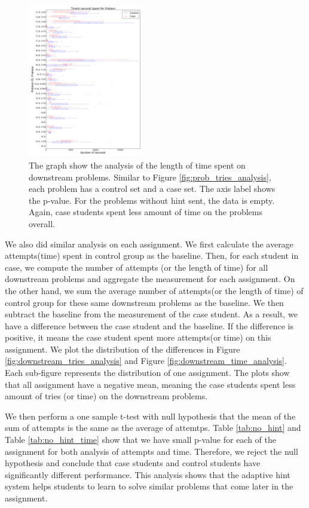 \documentclass{sigchi}
\begin{document}
\begin{figure}[ht]
  \centering
\includegraphics[width=0.45\textwidth]{image/problem_time_downstream.png}
  \caption{The graph show the analysis of the length of time spent on downstream problems. Similar to Figure \ref{fig:prob_tries_analysis}, each problem has a control set and a case set. The axis label shows the p-value. For the problems without hint sent, the data is empty. Again, case students spent less amount of time on the problems overall.}
   \label{fig:prob_time_analysis}
\end{figure}


We also did similar analysis on each assignment. We first calculate the average attempts(time) spent in control group as the baseline. Then, for each student in case, we compute the number of attempts (or the length of time) for all downstream problems and aggregate the measurement for each assignment. On the other hand, we sum the average number of attempts(or the length of time) of control group for these same downstream problems as the baseline. We then subtract the baseline from the measurement of the case student. As a result, we have a difference between the case student and the baseline. If the difference is positive, it means the case student spent more attempts(or time) on this assignment. We plot the distribution of the differences in Figure \ref{fig:downstream_tries_analysis} and Figure \ref{fig:downstream_time_analysis}. Each sub-figure represents the distribution of one assignment. The plots show that all assignment have a negative mean, meaning the case students spent less amount of tries (or time) on the downstream problems.

We then perform a one sample t-test with null hypothesis that the mean of the sum of attempts is the same as the average of attemtps. Table \ref{tab:no_hint} and Table \ref{tab:no_hint_time} show that we have small p-value for each of the assignment for both analysis of attempts and time. Therefore, we reject the null hypothesis and conclude that case students and control students have significantly different performance. This analysis shows that the adaptive hint system helps students to learn to solve similar problems that come later in the assignment. 
\end{document}
